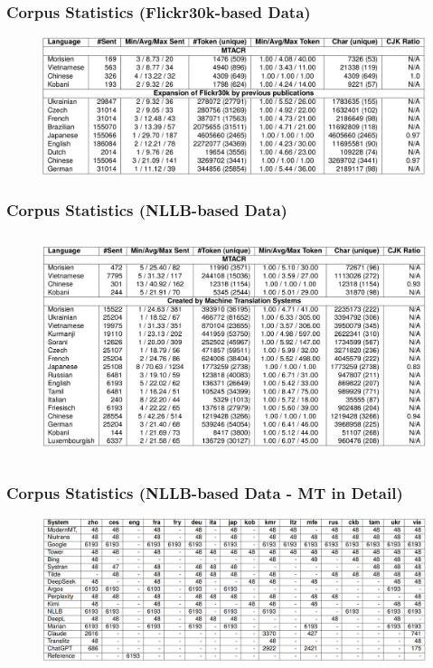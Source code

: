 \documentclass[aspectratio=169]{beamer}
\begin{document}
\begin{frame}[fragile]
	\frametitle{Corpus Statistics (Flickr30k-based Data)}
    \begin{figure}
    \centering
        \includegraphics[width=1.0\textwidth]{images/MTACR-Corpus_statistics_for_Flickr30k_dataset.png} 
    \end{figure}
\end{frame}

\begin{frame}[fragile]
	\frametitle{Corpus Statistics (NLLB-based Data)}
    \begin{figure}
    \centering
        \includegraphics[height=6.5cm]{images/MTACR-Corpus_statistics_for_NLLB_dataset.png} 
    \end{figure}
\end{frame}

\begin{frame}[fragile]
	\frametitle{Corpus Statistics (NLLB-based Data - MT in Detail)}
    \begin{figure}
    \centering
        \includegraphics[width=1.0\textwidth]{images/MTACR-Total_sentences_for_each_translation_system_and_language.png} 
    \end{figure}
\end{frame}
\end{document}
